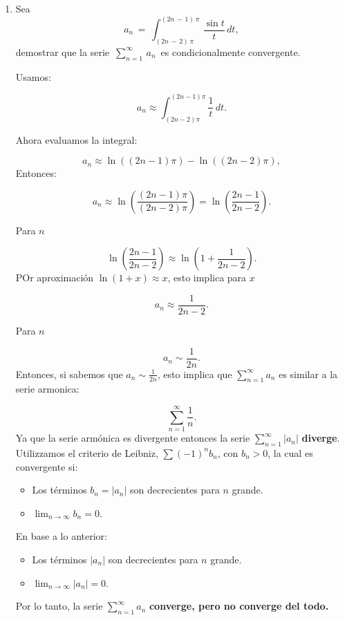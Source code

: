 \documentclass{article}
\begin{document}
\begin{enumerate}
\item Sea
\[
a_n\,=\,\int_{(2n\,-\,2)\,\pi}^{(2n\,-\,1)\,\pi}\,\frac{\sin t}{t}\,dt,
\]
demostrar que la serie \,$\displaystyle\sum_{n=1}^\infty\,a_n$\, es condicionalmente convergente.


Usamos:

\[
a_n \approx \int_{(2n-2)\pi}^{(2n-1)\pi} \frac{1}{t} \, dt.
\]

Ahora evaluamos la integral:

\[
a_n \approx \ln\left( (2n-1)\pi \right) - \ln\left( (2n-2)\pi \right),
\]
Entonces:

\[
a_n \approx \ln\left( \frac{(2n-1)\pi}{(2n-2)\pi} \right) = \ln\left( \frac{2n-1}{2n-2} \right).
\]

Para \(n\)

\[
\ln\left( \frac{2n-1}{2n-2} \right) \approx \ln\left( 1 + \frac{1}{2n-2} \right).
\]
POr aproximación \(\ln(1+x) \approx x\), esto implica para \(x\) 

\[
a_n \approx \frac{1}{2n-2}.
\]

Para \(n\) 

\[
a_n \sim \frac{1}{2n}.
\]
Entonces, si sabemos que \(a_n \sim \frac{1}{2n}\), esto implica que \(\sum_{n=1}^\infty a_n\) es similar a la serie armonica:

\[
\sum_{n=1}^\infty \frac{1}{n}.
\]
Ya que la serie armónica es divergente entonces la serie \(\sum_{n=1}^\infty |a_n|\) \textbf{diverge}.
Utilizzamos el criterio de Leibniz,  \(\sum (-1)^n b_n\), con \(b_n > 0\), la cual es convergente si:

\begin{itemize}
    \item Los términos \(b_n = |a_n|\) son decrecientes para \(n\) grande.
    \item \(\lim_{n \to \infty} b_n = 0\).
\end{itemize}
En base a lo anterior:
\begin{itemize}
    \item Los términos \(|a_n|\) son decrecientes para \(n\) grande.
    \item \(\lim_{n \to \infty} |a_n| = 0\).
\end{itemize}

Por lo tanto, la serie \(\sum_{n=1}^\infty a_n\) \textbf{converge, pero no converge del todo.}










\end{enumerate}
\end{document}
